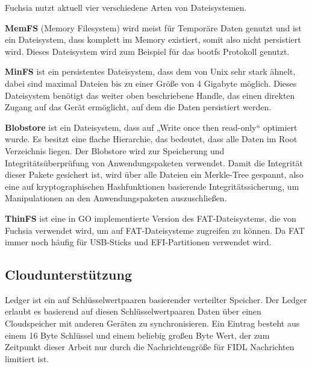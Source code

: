 \documentclass[a4paper]{scrartcl}
\begin{document}
Fuchsia nutzt aktuell vier verschiedene Arten von Dateisystemen.\cite{Fuchsia.Storage}

\textbf{MemFS} (Memory Filesystem) wird meist für Temporäre Daten genutzt und ist ein Dateisystem, dass komplett im Memory existiert, somit also nicht persistiert wird. Dieses Dateisystem wird zum Beispiel für das bootfs Protokoll genutzt.

\textbf{MinFS} ist ein persistentes Dateisystem, dass dem von Unix sehr stark ähnelt, dabei sind maximal Dateien bis zu einer Größe von 4 Gigabyte möglich. Dieses Dateisystem benötigt das weiter oben beschriebene Handle, das einen direkten Zugang auf das Gerät ermöglicht, auf dem die Daten persistiert werden.

\textbf{Blobstore} ist ein Dateisystem, dass auf „Write once then read-only“ optimiert wurde. Es besitzt eine flache Hierarchie, das bedeutet, dass alle Daten im Root Verzeichnis liegen. Der Blobstore wird zur Speicherung und Integritätsüberprüfung von Anwendungspaketen verwendet. Damit die Integrität dieser Pakete gesichert ist, wird über alle Dateien ein Merkle-Tree gespannt, also eine auf kryptographischen Hashfunktionen basierende Integritätssicherung, um Manipulationen an den Anwendungspaketen auszuschließen.

\textbf{ThinFS} ist eine in GO implementierte Version des FAT-Dateisystems, die von Fuchsia verwendet wird, um auf FAT-Dateisysteme zugreifen zu können. Da FAT immer noch häufig für USB-Sticks und EFI-Partitionen verwendet wird.
\subsection{Cloudunterstützung}
\label{sec:Ledger}
Ledger ist ein auf Schlüsselwertpaaren basierender verteilter Speicher. Der Ledger erlaubt es basierend auf diesen Schlüsselwertpaaren Daten über einen Cloudspeicher mit anderen Geräten zu synchronisieren. Ein Eintrag besteht aus einem 16 Byte Schlüssel und einem beliebig großen Byte Wert, der zum Zeitpunkt dieser Arbeit nur durch die Nachrichtengröße für FIDL Nachrichten limitiert ist.
\end{document}
